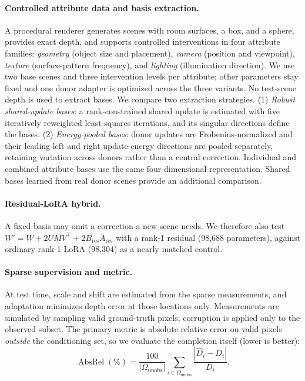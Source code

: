 \documentclass{article}
\begin{document}
\paragraph{Controlled attribute data and basis extraction.} A procedural renderer generates scenes with room surfaces, a box, and a sphere, provides exact depth, and supports controlled interventions in four attribute families: \emph{geometry} (object size and placement), \emph{camera} (position and viewpoint), \emph{texture} (surface-pattern frequency), and \emph{lighting} (illumination direction). We use two base scenes and three intervention levels per attribute; other parameters stay fixed and one donor adapter is optimized across the three variants. No test-scene depth is used to extract bases. We compare two extraction strategies. (1) \emph{Robust shared-update bases}: a rank-constrained shared update is estimated with five iteratively reweighted least-squares iterations, and its singular directions define the bases. (2) \emph{Energy-pooled bases}: donor updates are Frobenius-normalized and their leading left and right update-energy directions are pooled separately, retaining variation across donors rather than a central correction. Individual and combined attribute bases use the same four-dimensional representation. Shared bases learned from real donor scenes provide an additional comparison.

\paragraph{Residual-LoRA hybrid.} A fixed basis may omit a correction a new scene needs. We therefore also test $W' = W + 2UMV^\top + 2B_{\mathrm{res}}A_{\mathrm{res}}$ with a rank-1 residual (98,688 parameters), against ordinary rank-1 LoRA (98,304) as a nearly matched control.

\paragraph{Sparse supervision and metric.} At test time, scale and shift are estimated from the sparse measurements, and adaptation minimizes depth error at those locations only. Measurements are simulated by sampling valid ground-truth pixels; corruption is applied only to the observed subset. The primary metric is absolute relative error on valid pixels \emph{outside} the conditioning set, so we evaluate the completion itself (lower is better):
\begin{equation}
\operatorname{AbsRel}(\%)=\frac{100}{|\Omega_{\mathrm{unobs}}|}\sum_{i\in\Omega_{\mathrm{unobs}}}\frac{|\widehat D_i-D_i|}{D_i}.
\end{equation}
\end{document}
